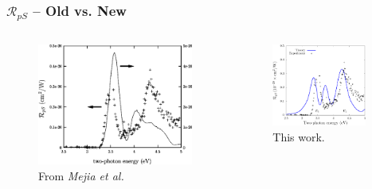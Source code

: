 \documentclass{beamer}
\begin{document}
\begin{frame}
\frametitle{\texorpdfstring{$\mathcal{R}_{pS}$}{RpS} -- Old vs. New}
\begin{columns}
\begin{figure}
\centering
\includegraphics[width=\textwidth]{mejia-001}
\caption{From \emph{Mejia et al.}}
\end{figure}
\begin{figure}
\centering
\includegraphics[width=0.9\textwidth]{fig-rps}
\caption{This work.}
\end{figure}
\end{columns}
\end{frame}
\end{document}
